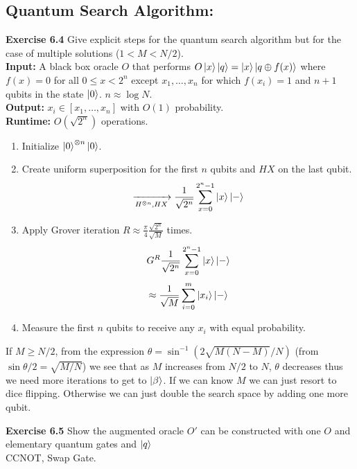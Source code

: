 \documentclass{article}
\begin{document}
\subsection{Quantum Search Algorithm:}
\begin{tcolorbox}\textbf{Exercise 6.4} Give explicit steps for the quantum search algorithm but for the case of multiple solutions ($1 < M < N/2$).\\
	\textbf{Input:} A black box oracle $O$ that performs $O\ket{x}\ket{q} = \ket{x}\ket{q \oplus f(x)}$ where $f(x) = 0$ for all $0 \leq x < 2^n$ except $x_1, \dots, x_n$ for which $f(x_i) = 1$ and $n+1$ qubits in the state $\ket{0}$. $n \approx \log N$.\\
	\textbf{Output:} $x_i \in [x_1, \dots, x_n]$ with $O(1)$ probability.\\
	\textbf{Runtime:} $O(\sqrt{2^n})$ operations.
	\begin{enumerate}
		\item Initialize $\ket{0}^{\otimes n}\ket{0}$.
		\item Create uniform superposition for the first $n$ qubits and $HX$ on the last qubit. 
			$$\xrightarrow[H^{\otimes n}, HX]{} \frac{1}{\sqrt{2^n}} \sum_{x=0}^{2^n-1} \ket{x}\ket{-}$$
		\item Apply Grover iteration $R \approx \frac{\pi}{4} \frac{\sqrt{2^n}}{\sqrt{ M}}$ times.
			$$G^R \frac{1}{\sqrt{2^n}} \sum_{x=0}^{2^n - 1} \ket{x}\ket{-}$$
			$$\approx \frac{1}{\sqrt{M}}\sum_{i=0}^{m} \ket{x_i} \ket{-}$$
		\item  Measure the first $n$ qubits to receive any $x_i$ with equal probability.
	\end{enumerate}
\end{tcolorbox}
If $M \geq N/2$, from the expression $\theta = \sin^{-1} (2\sqrt{M(N-M)}/N)$ (from $\sin \theta/2 =  \sqrt{M/N}$) we see that as $M$ increases from $N/2$ to $N$, $\theta$ decreases thus we need more iterations to get to $\ket{\beta}$. If we can know $M$ we can just resort to dice flipping. Otherwise we can just double the search space by adding one more qubit.
\begin{tcolorbox}\textbf{Exercise 6.5} Show the augmented oracle $O'$ can be constructed with one $O$ and elementary quantum gates and $\ket{q}$\\
	CCNOT, Swap Gate.
\end{tcolorbox}
\end{document}
